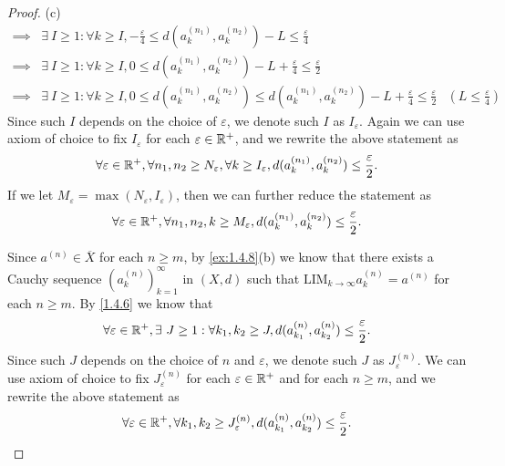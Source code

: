 \begin{proof}{(c)}
\begin{align*}
    \implies & \exists\ I \geq 1 : \forall k \geq I, -\frac{\varepsilon}{4} \leq d(a_k^{(n_1)}, a_k^{(n_2)}) - L \leq \frac{\varepsilon}{4}                                                                      \\
    \implies & \exists\ I \geq 1 : \forall k \geq I, 0 \leq d(a_k^{(n_1)}, a_k^{(n_2)}) - L + \frac{\varepsilon}{4} \leq \frac{\varepsilon}{2}                                                                   \\
    \implies & \exists\ I \geq 1 : \forall k \geq I, 0 \leq d(a_k^{(n_1)}, a_k^{(n_2)}) \leq d(a_k^{(n_1)}, a_k^{(n_2)}) - L + \frac{\varepsilon}{4} \leq \frac{\varepsilon}{2} & (L \leq \frac{\varepsilon}{4})
  \end{align*}
  Since such \(I\) depends on the choice of \(\varepsilon\), we denote such \(I\) as \(I_\varepsilon\).
  Again we can use axiom of choice to fix \(I_\varepsilon\) for each \(\varepsilon \in \mathbb{R}^+\), and we rewrite the above statement as
  \[
    \forall \varepsilon \in \mathbb{R}^+, \forall n_1, n_2 \geq N_\varepsilon, \forall k \geq I_\varepsilon, d(a_k^{(n_1)}, a_k^{(n_2)}) \leq \frac{\varepsilon}{2}.
  \]
  If we let \(M_\varepsilon = \max(N_\varepsilon, I_\varepsilon)\), then we can further reduce the statement as
  \[
    \forall \varepsilon \in \mathbb{R}^+, \forall n_1, n_2, k \geq M_\varepsilon, d(a_k^{(n_1)}, a_k^{(n_2)}) \leq \frac{\varepsilon}{2}.
  \]

  Since \(a^{(n)} \in \overline{X}\) for each \(n \geq m\), by \cref{ex:1.4.8}(b) we know that there exists a Cauchy sequence \((a_k^{(n)})_{k = 1}^\infty\) in \((X, d)\) such that \(\text{LIM}_{k \to \infty} a_k^{(n)} = a^{(n)}\) for each \(n \geq m\).
  By \cref{1.4.6} we know that
  \[
    \forall \varepsilon \in \mathbb{R}^+, \exists\ J \geq 1 : \forall k_1, k_2 \geq J, d(a_{k_1}^{(n)}, a_{k_2}^{(n)}) \leq \frac{\varepsilon}{2}.
  \]
  Since such \(J\) depends on the choice of \(n\) and \(\varepsilon\), we denote such \(J\) as \(J_\varepsilon^{(n)}\).
  We can use axiom of choice to fix \(J_\varepsilon^{(n)}\) for each \(\varepsilon \in \mathbb{R}^+\) and for each \(n \geq m\), and we rewrite the above statement as
  \[
    \forall \varepsilon \in \mathbb{R}^+, \forall k_1, k_2 \geq J_\varepsilon^{(n)}, d(a_{k_1}^{(n)}, a_{k_2}^{(n)}) \leq \frac{\varepsilon}{2}.
  \]


\end{proof}
